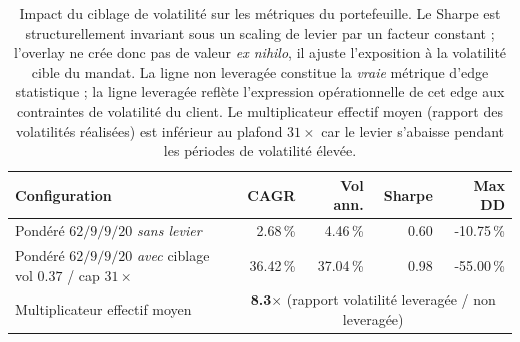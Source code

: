 \begin{table}[H]
\centering
\caption{Impact du ciblage de volatilité sur les métriques du portefeuille. Le Sharpe est structurellement invariant sous un scaling de levier par un facteur constant ; l'overlay ne crée donc pas de valeur \emph{ex nihilo}, il ajuste l'exposition à la volatilité cible du mandat. La ligne non leveragée constitue la \emph{vraie} métrique d'edge statistique ; la ligne leveragée reflète l'expression opérationnelle de cet edge aux contraintes de volatilité du client. Le multiplicateur effectif moyen (rapport des volatilités réalisées) est inférieur au plafond $31\times$ car le levier s'abaisse pendant les périodes de volatilité élevée.}
\label{tab:leverage_impact}
\begin{tabular}{lrrrr}
\toprule
Configuration & CAGR & Vol ann. & Sharpe & Max DD \\
\midrule
Pondéré $62/9/9/20$ \emph{sans levier} & 2.68\,\% & 4.46\,\% & 0.60 & -10.75\,\% \\
Pondéré $62/9/9/20$ \emph{avec} ciblage vol $0.37$ / cap $31\times$ & 36.42\,\% & 37.04\,\% & 0.98 & -55.00\,\% \\
Multiplicateur effectif moyen & \multicolumn{4}{c}{\textbf{8.3$\times$} (rapport volatilité leveragée / non leveragée)} \\
\bottomrule
\end{tabular}
\end{table}
